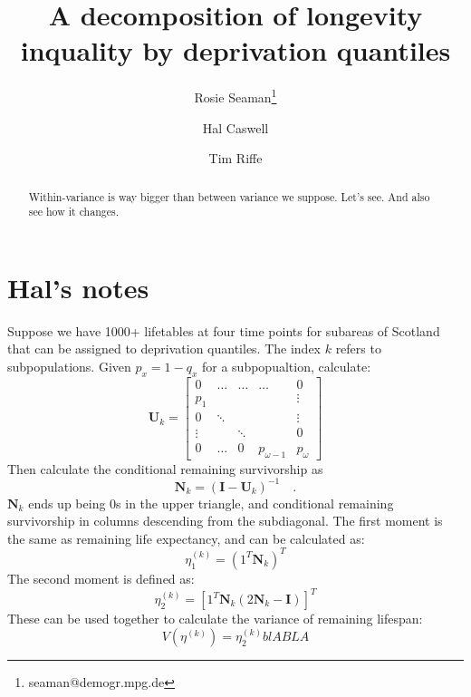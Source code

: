 \documentclass[12pt,oneside,a4paper]{article} %
\theoremstyle{definition}
\begin{document}
\title{A decomposition of longevity inquality by deprivation quantiles}
\author[1]{Rosie Seaman\thanks{seaman@demogr.mpg.de}}
\author[2]{Hal Caswell}
\author[1]{Tim Riffe}


\maketitle

\begin{abstract}
Within-variance is way bigger than between variance we suppose. Let's see. And
also see how it changes.
\end{abstract}

\section{Hal's notes}

Suppose we have 1000+ lifetables at four time points for subareas of Scotland
that can be assigned to deprivation quantiles. The index $k$ refers to
subpopulations. Given $p_x = 1- q_x$ for a subpopualtion, calculate:
\begin{equation}
\mathbf{U}_k = 
\begin{bmatrix}
    0     & \hdots  & \hdots &  \hdots  & 0 \\
    p_{1} &   &    &    &  \vdots \\
    0 & \ddots &   &   & \vdots \\
    \vdots & & \ddots & & 0\\
   0 &  \hdots & 0 & p_{\omega-1}  & p_{\omega}
\end{bmatrix}
\end{equation}
Then calculate the conditional remaining survivorship as
\begin{equation}
\mathbf{N}_k = (\mathbf{I} - \mathbf{U}_k )^{-1} \quad .
\end{equation}
$\mathbf{N}_k$ ends up being 0s in the upper triangle, and conditional remaining
survivorship in columns descending from the subdiagonal. The first moment is the
same as remaining life expectancy, and can be calculated as:
\begin{equation}
\eta^{(k)}_1 = (1^T \mathbf{N}_k)^T
\end{equation}
The second moment is defined as:
\begin{equation}
\eta^{(k)}_2 = \left[ 1^T \mathbf{N}_k (2\mathbf{N}_k - \mathbf{I})\right]^T
\end{equation}
These can be used together to calculate the variance of remaining lifespan:
\begin{equation}
V(\eta^{(k)}) = \eta^{(k)}_2 blA BLA
\end{equation}
\end{document}

